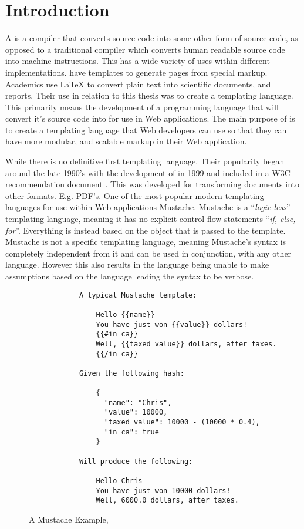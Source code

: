 \section{Introduction}

A \compiler{}  is a compiler that converts source code into some other form of source code, as opposed to a traditional compiler which converts human readable source code into machine instructions. This has a wide variety of uses within different implementations.  have templates to generate  pages from special markup. Academics use \LaTeX{} to convert plain text into scientific documents, and reports. Their use in relation to this thesis was to create a templating language. This primarily means the development of a programming language that will convert it's source code into  for use in Web applications. The  main purpose of \languageName{} is to create a templating language that Web developers can use so that they can have more modular, and scalable markup in their Web application.

While there is no definitive first templating language. Their popularity began around the late 1990's with the development of  in 1999 and included in a W3C recommendation document \cite{XSLT}. This was developed for transforming  documents into other formats. E.g. PDF's\cite{XSLTEx}. 
\newpage
One of the most popular modern templating languages for use within Web applications Mustache\cite{Mustache}. Mustache is a ``\textit{logic-less}'' templating language, meaning it has no explicit control flow statements ``\textit{if, else, for}''\cite{MustacheMan}. Everything is instead based on the object that is passed to the template. Mustache is not a  specific templating language, meaning Mustache's syntax is completely independent from it and can be used in conjunction, with any other language. However this also results in the language being unable to make assumptions based on the language leading the syntax to be verbose. 

\begin{figure}[!hbtp]
    \small
    \begin{verbatim}
            A typical Mustache template:

                Hello {{name}}
                You have just won {{value}} dollars!
                {{#in_ca}}
                Well, {{taxed_value}} dollars, after taxes.
                {{/in_ca}}

            Given the following hash:

                {
                  "name": "Chris",
                  "value": 10000,
                  "taxed_value": 10000 - (10000 * 0.4),
                  "in_ca": true
                }

            Will produce the following:

                Hello Chris
                You have just won 10000 dollars!
                Well, 6000.0 dollars, after taxes.
    \end{verbatim}
    \caption{A Mustache Example, \cite{MustacheMan}}
    \label{fig:mustacheEx}
\end{figure}
\newpage

